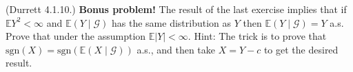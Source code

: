 \documentclass[12pt]{gradescopeexam}
\newcommand\E{\mathbb{E}}
\newcommand\sgn{\mathrm{sgn}}
\renewcommand\c[1]{\mathcal{#1}}
\begin{document}
\begin{questions}
  \begin{question}
    (Durrett 4.1.10.) \textbf{\color{magenta} Bonus problem!}  The
    result of the last exercise implies that if $\E Y^2 <\infty$ and
    $\E(Y \mid \c{G})$ has the same distribution as $Y$ then
    $\E(Y \mid \c{G})=Y$ a.s.  Prove that under the assumption
    $\E |Y| <\infty$. Hint: The trick is to prove that
    $\sgn(X)=\sgn(\E(X \mid \c{G}))$ a.s., and then take $X=Y-c$ to get
    the desired result.
    \begin{solutionorbox}[6.5in]
    \end{solutionorbox}
  \end{question}

  
\end{questions}
\end{document}
